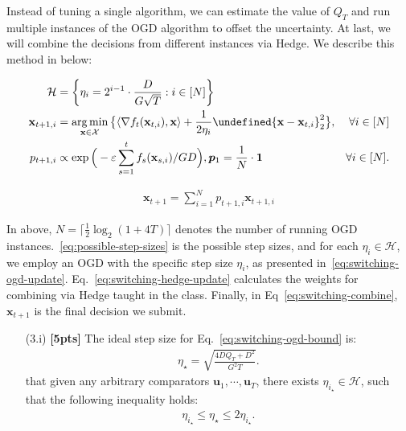 \documentclass[a4paper]{article}
\numberwithin{equation}{section}
\theoremstyle{definition}
\newcommand\inner[2]{\langle #1, #2 \rangle}
\DeclareMathOperator*{\argmin}{arg\,min}
\theoremstyle{definition}
\def \X {\mathcal{X}}
\def \p {\boldsymbol{p}}
\def \u {\textbf{u}}
\def \x {\textbf{x}}
\let\norm\undefined
\let\epsilon\varepsilon
\DeclarePairedDelimiter\norm{\lVert}{\rVert}
\begin{document}
\begin{enumerate}
  Instead of tuning a single algorithm, we can estimate the value of $Q_T$ and run multiple instances of the OGD algorithm to offset the uncertainty. At last, we will combine the decisions from different instances via Hedge. We describe this method in below:
  \begin{tcolorbox}[top=-7pt, bottom=1pt]
    \begin{align}
      \mathcal{H} &= \left\{\eta_i = 2^{i-1} \cdot \frac{D}{G\sqrt{T}}: i \in [N] \right\}\label{eq:possible-step-sizes}\\
      \x_{t+1, i} &= \argmin_{\x \in \X} \big\{\inner{\nabla f_t(\x_{t, i})}{\x} + \frac{1}{2\eta_i}\norm{\x - \x_{t,i}}_2^2 \big\}, &\forall i \in [N] \label{eq:switching-ogd-update}\\
      p_{t+1,i} &\propto \exp\Big(-\epsilon \sum_{s=1}^t f_s(\x_{s,i})/GD\Big), \p_1 = \frac{1}{N}\cdot \boldsymbol{1} &\forall i \in [N].\label{eq:switching-hedge-update}
    \end{align}
  \end{tcolorbox}
  \begin{tcolorbox}[top=-7pt, bottom=1pt]
    \begin{align}
      \label{eq:switching-combine}
      \x_{t+1} = \sum_{i=1}^N p_{t+1,i}\x_{t+1,i}
    \end{align}
  \end{tcolorbox}
  In above, $N = \lceil \frac{1}{2}\log_2(1+4T) \rceil$ denotes the number of running OGD instances.~\eqref{eq:possible-step-sizes} is the possible step sizes, and for each $\eta_i \in \mathcal{H}$, we employ an OGD with the specific step size $\eta_i$, as presented in~\eqref{eq:switching-ogd-update}. Eq.~\eqref{eq:switching-hedge-update} calculates the weights for combining via Hedge taught in the class. Finally, in Eq~\eqref{eq:switching-combine}, $\x_{t+1}$ is the final decision we submit.
  \begin{enumerate}
    \item[(3.i)] \textbf{[5pts]} The ideal step size for Eq.~\eqref{eq:switching-ogd-bound} is:
    \begin{align*}
      \eta_\star = \sqrt{\frac{4DQ_T+D^2}{G^2T}}.
    \end{align*}
     that given any arbitrary comparators $\u_1, \cdots, \u_T$, there exists $\eta_{i_\star} \in \mathcal{H}$, such that the following inequality holds:
    \begin{align*}
      \eta_{i_\star} \leq \eta_\star \leq 2\eta_{i_\star}.
    \end{align*}

\end{enumerate}
\end{enumerate}
\end{document}
